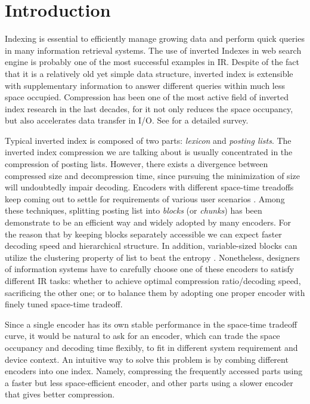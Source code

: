 \documentclass{sig-alternate-05-2015}
\begin{document}

\section{Introduction}\label{sec:intro}
Indexing is essential to efficiently manage growing data and perform quick queries in many information retrieval systems.
The use of inverted Indexes in web search engine is probably one of the most successful examples in IR.
Despite of the fact that it is a relatively old yet simple data structure, inverted index is extensible with supplementary information to answer different queries within much less space occupied.
Compression has been one of the most active field of inverted index research in the last decades, for it not only reduces the space occupancy, but also accelerates data transfer in I/O.
See \cite{catena2014inverted,trotman2014compression,zobel2006inverted} for a detailed survey.

Typical inverted index is composed of two parts: \textit{lexicon} and \textit{posting lists}.
The inverted index compression we are talking about is usually concentrated in the compression of posting lists.
However, there exists a divergence between compressed size and decompression time,
since pursuing the minimization of size will undoubtedly impair decoding.
Encoders with different space-time treadoffs keep coming out to settle for requirements of various user scenarios \cite{lemire2015decoding,ottaviano2015optimal,ottaviano2014partitioned,petri2014score,silvestri2010vsencoding}.
Among these techniques, splitting posting list into \textit{blocks} (or \textit{chunks}) has been demonstrate to be an efficient way and widely adopted by many encoders.
For the reason that by keeping blocks separately accessible we can expect faster decoding speed and hierarchical structure.
In addition, variable-sized blocks can utilize the clustering property of list to beat the entropy \cite{moffat2000binary,silvestri2010vsencoding}.
Nonetheless, designers of information systems have to carefully choose one of these encoders to satisfy different IR tasks: whether to achieve optimal compression ratio/decoding speed, sacrificing the other one; or to balance them by adopting one proper encoder with finely tuned space-time tradeoff.

Since a single encoder has its own stable performance in the space-time tradeoff curve, it would be natural to ask for an encoder, which can trade the space occupancy and decoding time flexibly, to fit in different system requirement and device context.
An intuitive way to solve this problem is by combing different encoders into one index.
Namely, compressing the frequently accessed parts using a faster but less space-efficient encoder, and other parts using a slower encoder that gives better compression.
\end{document}
